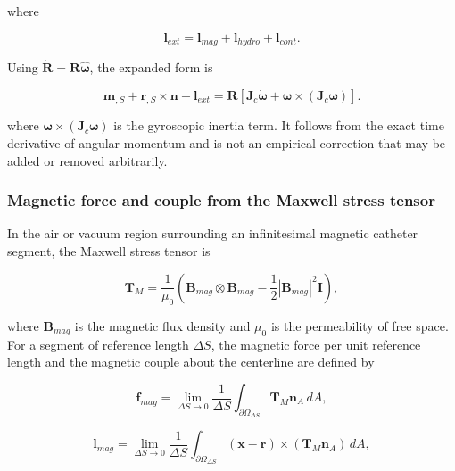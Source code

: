 where

\begin{equation}
\label{eq:rod-1-41}
\mathbf{l}_{ext} = \mathbf{l}_{mag} + \mathbf{l}_{hydro} + \mathbf{l}_{cont}.
\end{equation}

Using \(\dot{\mathbf{R}} = \mathbf{R}\widehat{\bm{\omega}}\), the expanded form is

\begin{equation}
\label{eq:rod-1-42}
\mathbf{m}_{,S} + \mathbf{r}_{,S} \times \mathbf{n} + \mathbf{l}_{ext} = \mathbf{R}\left\lbrack \mathbf{J}_{c}\dot{\bm{\omega}} + \bm{\omega} \times \left( \mathbf{J}_{c}\bm{\omega} \right) \right\rbrack.
\end{equation}

where \(\bm{\omega} \times \left( \mathbf{J}_{c}\bm{\omega} \right)\) is the gyroscopic inertia term. It follows from the exact time derivative of angular momentum and is not an empirical correction that may be added or removed arbitrarily.

\subsubsection{Magnetic force and couple from the Maxwell stress tensor}\label{sec:rod-1-4-3}

In the air or vacuum region surrounding an infinitesimal magnetic catheter segment, the Maxwell stress tensor is\cite{Jackson1998Electrodynamics,Abbott2020MagneticRobotics}

\begin{equation}
\label{eq:rod-1-43}
\mathbf{T}_{M} = \frac{1}{\mu_{0}}\left( \mathbf{B}_{mag} \otimes \mathbf{B}_{mag} - \frac{1}{2}\left| \mathbf{B}_{mag} \right|^{2}\mathbf{I} \right),
\end{equation}

where \(\mathbf{B}_{mag}\) is the magnetic flux density and \(\mu_{0}\) is the permeability of free space. For a segment of reference length \(\Delta S\), the magnetic force per unit reference length and the magnetic couple about the centerline are defined by

\begin{equation}
\label{eq:rod-1-44}
\mathbf{f}_{mag} = \lim_{\Delta S \rightarrow 0}\frac{1}{\Delta S}\int_{\partial\Omega_{\Delta S}}^{}\mathbf{T}_{M}\mathbf{n}_{A}\, dA,
\end{equation}

\begin{equation}
\label{eq:rod-1-45}
\mathbf{l}_{mag} = \lim_{\Delta S \rightarrow 0}\frac{1}{\Delta S}\int_{\partial\Omega_{\Delta S}}^{}\left( \mathbf{x} - \mathbf{r} \right) \times \left( \mathbf{T}_{M}\mathbf{n}_{A} \right)\, dA,
\end{equation}

